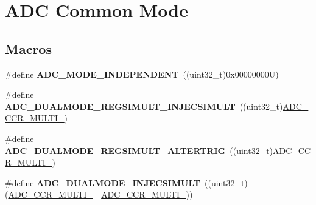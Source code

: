 \hypertarget{group___a_d_c_ex___common__mode}{}\section{A\+DC Common Mode}
\label{group___a_d_c_ex___common__mode}
\subsection*{Macros}
\begin{DoxyCompactItemize}
\item 
\mbox{\label{group___a_d_c_ex___common__mode_gaac07297889e931df4083427a99211638}} 
\#define {\bfseries A\+D\+C\+\_\+\+M\+O\+D\+E\+\_\+\+I\+N\+D\+E\+P\+E\+N\+D\+E\+NT}~((uint32\+\_\+t)0x00000000\+U)
\item 
\mbox{\label{group___a_d_c_ex___common__mode_gac3ad57b1150ca7862fcc932cf19b2fb0}} 
\#define {\bfseries A\+D\+C\+\_\+\+D\+U\+A\+L\+M\+O\+D\+E\+\_\+\+R\+E\+G\+S\+I\+M\+U\+L\+T\+\_\+\+I\+N\+J\+E\+C\+S\+I\+M\+U\+LT}~((uint32\+\_\+t)\mbox{\hyperlink{group___peripheral___registers___bits___definition_gae4e7104ce01e3a79b8f6138d87dc3684}{A\+D\+C\+\_\+\+C\+C\+R\+\_\+\+M\+U\+L\+T\+I\+\_}})
\item 
\mbox{\label{group___a_d_c_ex___common__mode_ga2667b75f8acb086aa6ab723466bb3f40}} 
\#define {\bfseries A\+D\+C\+\_\+\+D\+U\+A\+L\+M\+O\+D\+E\+\_\+\+R\+E\+G\+S\+I\+M\+U\+L\+T\+\_\+\+A\+L\+T\+E\+R\+T\+R\+IG}~((uint32\+\_\+t)\mbox{\hyperlink{group___peripheral___registers___bits___definition_ga8781dec7f076b475b85f8470aee94d06}{A\+D\+C\+\_\+\+C\+C\+R\+\_\+\+M\+U\+L\+T\+I\+\_}})
\item 
\mbox{\label{group___a_d_c_ex___common__mode_ga8e81364b24ed3c089bb6993b48a020e9}} 
\#define {\bfseries A\+D\+C\+\_\+\+D\+U\+A\+L\+M\+O\+D\+E\+\_\+\+I\+N\+J\+E\+C\+S\+I\+M\+U\+LT}~((uint32\+\_\+t)(\mbox{\hyperlink{group___peripheral___registers___bits___definition_gae6a5be6cff1227431b8d54dffcc1ce88}{A\+D\+C\+\_\+\+C\+C\+R\+\_\+\+M\+U\+L\+T\+I\+\_}} $\vert$ \mbox{\hyperlink{group___peripheral___registers___bits___definition_gae4e7104ce01e3a79b8f6138d87dc3684}{A\+D\+C\+\_\+\+C\+C\+R\+\_\+\+M\+U\+L\+T\+I\+\_}}))
\item 

\end{DoxyCompactItemize}
